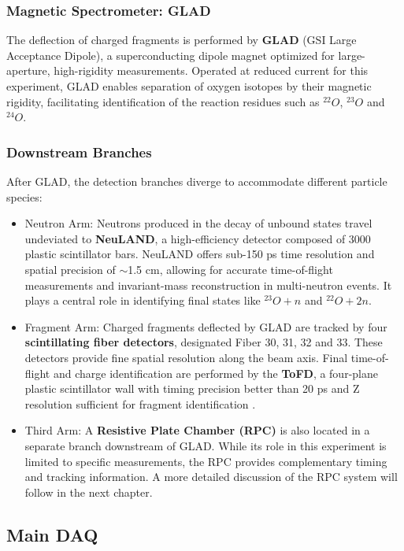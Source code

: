 \subsubsection{Magnetic Spectrometer: GLAD}

The deflection of charged fragments is performed by \textbf{GLAD} (GSI Large Acceptance Dipole), a superconducting dipole magnet optimized for large-aperture, high-rigidity measurements. Operated at reduced current for this experiment, GLAD enables separation of oxygen isotopes by their magnetic rigidity, facilitating identification of the reaction residues such as $^{22}O$, $^{23}O$ and $^{24}O$.

\subsubsection{Downstream Branches}

After GLAD, the detection branches diverge to accommodate different particle species:

\begin{itemize}
	\item Neutron Arm: Neutrons produced in the decay of unbound states travel undeviated to \textbf{NeuLAND}, a high-efficiency detector composed of 3000 plastic scintillator bars. NeuLAND offers sub-150 ps time resolution and spatial precision of $\sim$1.5 cm, allowing for accurate time-of-flight measurements and invariant-mass reconstruction in multi-neutron events. It plays a central role in identifying final states like $^{23}O + n$ and $^{22}O + 2n$.
	\item Fragment Arm: Charged fragments deflected by GLAD are tracked by four \textbf{scintillating fiber detectors}, designated Fiber 30, 31, 32 and 33. These detectors provide fine spatial resolution along the beam axis. Final time-of-flight and charge identification are performed by the \textbf{ToFD}, a four-plane plastic scintillator wall with timing precision better than 20 ps and Z resolution sufficient for fragment identification \cite{heil_new_2022}.
	\item Third Arm: A \textbf{Resistive Plate Chamber (RPC)} is also located in a separate branch downstream of GLAD. While its role in this experiment is limited to specific measurements, the RPC provides complementary timing and tracking information. A more detailed discussion of the RPC system will follow in the next chapter.
\end{itemize}


\subsection{Main DAQ}

